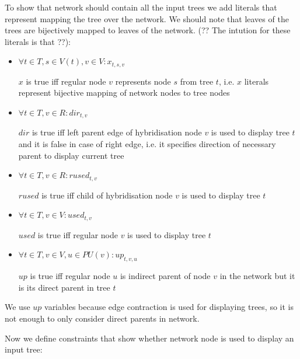 \documentclass[runningheads, envcountsame, a4paper]{llncs}
\begin{document}
To show that network should contain all the input trees we add literals that represent mapping the tree over the network. We should note that leaves of the trees are bijectively mapped to leaves of the network. (?? The intution for these literals is that ??):

\begin{itemize}

\item $\forall t \in T, s \in V(t), v \in V : x_{t,s,v}$

$x$ is true iff regular node $v$ represents node $s$ from tree $t$, i.e. $x$ literals represent bijective mapping of network nodes to tree nodes

\item $\forall t \in T, v \in R : dir_{t,v}$

$dir$ is true iff left parent edge of hybridisation node $v$ is used to display tree $t$ and it is false in case of right edge, i.e. it specifies direction of necessary parent to display current tree

\item $\forall t \in T, v \in R : rused_{t,v}$

$rused$ is true iff child of hybridisation node $v$ is used to display tree $t$

\item $\forall t \in T, v \in V : used_{t,v}$

$used$ is true iff regular node $v$ is used to display tree $t$

\item $\forall t \in T, v \in V, u \in PU(v) : up_{t,v,u}$

$up$ is true iff regular node $u$ is indirect parent of node $v$ in the network but it is its direct parent in tree $t$

\end{itemize}

We use $up$ variables because edge contraction is used for displaying trees, so it is not enough to only consider direct parents in network.

Now we define constraints that show whether network node is used to display an input tree:
\end{document}
